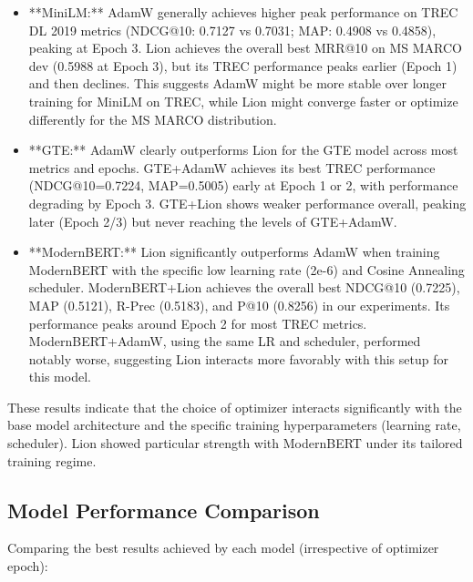 \documentclass[conference]{IEEEtran}
\begin{document}
\begin{itemize}
    \item **MiniLM:** AdamW generally achieves higher peak performance on TREC DL 2019 metrics (NDCG@10: 0.7127 vs 0.7031; MAP: 0.4908 vs 0.4858), peaking at Epoch 3. Lion achieves the overall best MRR@10 on MS MARCO dev (0.5988 at Epoch 3), but its TREC performance peaks earlier (Epoch 1) and then declines. This suggests AdamW might be more stable over longer training for MiniLM on TREC, while Lion might converge faster or optimize differently for the MS MARCO distribution.
    \item **GTE:** AdamW clearly outperforms Lion for the GTE model across most metrics and epochs. GTE+AdamW achieves its best TREC performance (NDCG@10=0.7224, MAP=0.5005) early at Epoch 1 or 2, with performance degrading by Epoch 3. GTE+Lion shows weaker performance overall, peaking later (Epoch 2/3) but never reaching the levels of GTE+AdamW.
    \item **ModernBERT:** Lion significantly outperforms AdamW when training ModernBERT with the specific low learning rate (2e-6) and Cosine Annealing scheduler. ModernBERT+Lion achieves the overall best NDCG@10 (0.7225), MAP (0.5121), R-Prec (0.5183), and P@10 (0.8256) in our experiments. Its performance peaks around Epoch 2 for most TREC metrics. ModernBERT+AdamW, using the same LR and scheduler, performed notably worse, suggesting Lion interacts more favorably with this setup for this model.
\end{itemize}
These results indicate that the choice of optimizer interacts significantly with the base model architecture and the specific training hyperparameters (learning rate, scheduler). Lion showed particular strength with ModernBERT under its tailored training regime.

\subsection{Model Performance Comparison}
Comparing the best results achieved by each model (irrespective of optimizer epoch):
\end{document}
